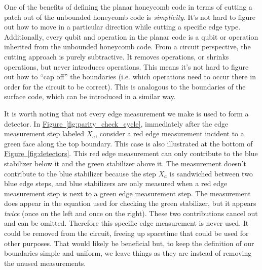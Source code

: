 \documentclass[onecolumn,a4paper,accepted=2022-09-12]{quantumarticle}
\theoremstyle{definition}
\theoremstyle{definition}
\theoremstyle{definition}
\newcommand{\fig}[1]{\hyperref[fig:#1]{Figure~\ref*{fig:#1}}}
\begin{document}
One of the benefits of defining the planar honeycomb code in terms of cutting a patch out of the unbounded honeycomb code is \emph{simplicity}.  
It's not hard to figure out how to move in a particular direction while cutting a specific edge type.
Additionally, every qubit and operation in the planar code is a qubit or operation inherited from the unbounded honeycomb code.
From a circuit perspective, the cutting approach is purely subtractive.
It removes operations, or shrinks operations, but never introduces operations.
This means it's not hard to figure out how to ``cap off'' the boundaries (i.e. which operations need to occur there in order for the circuit to be correct).
This is analogous to the boundaries of the surface code, which can be introduced in a similar way.

It is worth noting that not every edge measurement we make is used to form a detector.  
In \fig{parity_check_cycle}, immediately after the edge measurement step labeled $X_a$, consider a red edge measurement incident to a green face along the top boundary. This case is also illustrated at the bottom of \fig{detectors}.
This red edge measurement can only contribute to the blue stabilizer below it and the green stabilizer above it.
The measurement doesn't contribute to the blue stabilizer because the step $X_a$ is sandwiched between two blue edge steps, and blue stabilizers are only measured when a red edge measurement step is next to a green edge measurement step.
The measurement does appear in the equation used for checking the green stabilizer, but it appears \emph{twice} (once on the left and once on the right).
These two contributions cancel out and can be omitted.
Therefore this specific edge measurement is never used.
It could be removed from the circuit, freeing up spacetime that could be used for other purposes.
That would likely be beneficial but, to keep the definition of our boundaries simple and uniform, we leave things as they are instead of removing the unused measurements.
\end{document}
